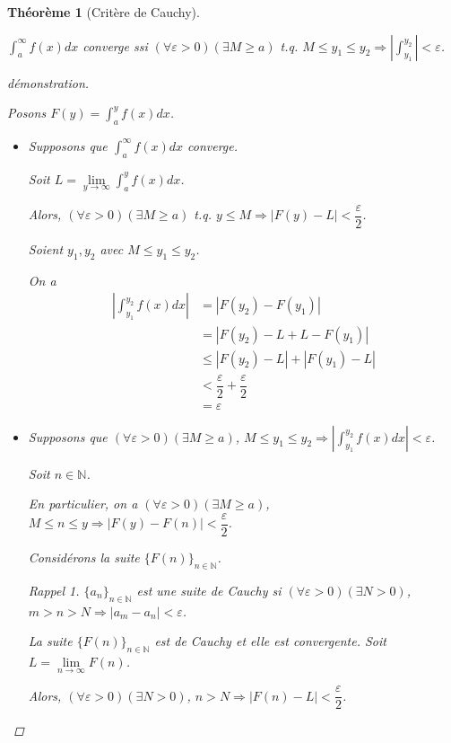 \documentclass{report}
\newcommand*{\abs}[1]{\left| #1 \right|}
\newcommand*{\eps}{\varepsilon}
\newcommand*{\naturels}{\mathbb{N}}
\newtheorem*{thm}{Th\'eor\`eme}
\theoremstyle{definition}
\theoremstyle{remark}
\newtheorem*{rapp}{Rappel}
\begin{document}
	\begin{thm}[Crit\`ere de Cauchy]~

		$\displaystyle\int_{a}^{\infty}f(x)dx$ converge ssi $(\forall\eps>0) (\exists M \geq a)$ t.q. $M \leq y_1 \leq y_2 \Rightarrow \abs{\displaystyle\int_{y_1}^{y_2}}<\eps$.
		\begin{proof}[d\'emonstration]~

			Posons $F(y) = \displaystyle\int_{a}^{y}f(x)dx$.
			\begin{itemize}
				\item[$(\Rightarrow)$] Supposons que $\displaystyle\int_{a}^{\infty}f(x)dx$ converge.

				Soit $L = \lim\limits_{y \to \infty}\displaystyle\int_{a}^{y}f(x)dx$.

				Alors, $(\forall\eps>0) (\exists M \geq a)$ t.q. $y \leq M \Rightarrow \abs{F(y)-L}<\dfrac{\eps}{2}$.

				Soient $y_1,y_2$ avec $M \leq y_1 \leq y_2$.

				On a
				\begin{align*}
					\abs{\int_{y_1}^{y_2}f(x)dx}&= \abs{F(y_2)-F(y_1)}\\
					&= \abs{F(y_2)-L+L-F(y_1)}\\
					&\leq \abs{F(y_2)-L} + \abs{F(y_1)-L}\\
					&< \dfrac{\eps}{2} + \dfrac{\eps}{2}\\
					&= \eps
				\end{align*}
				\item[$(\Leftarrow)$] Supposons que $(\forall\eps>0)(\exists M \geq a)$, $M \leq y_1 \leq y_2 \Rightarrow \abs{\int_{y_1}^{y_2}f(x)dx} < \eps$.

				Soit $n \in \naturels$.

				En particulier, on a $(\forall\eps>0) (\exists M \geq a)$, $M \leq n \leq y \Rightarrow \abs{F(y)-F(n)}<\dfrac{\eps}{2}$.

				Consid\'erons la suite $\{F(n)\}_{n \in \naturels}$.
				\begin{rapp}
					$\{a_n\}_{n \in \naturels}$ est une \emph{suite de Cauchy} si $(\forall\eps>0) (\exists N>0)$, $m>n>N \Rightarrow \abs{a_m-a_n}<\eps$.
				\end{rapp}

				La suite $\{F(n)\}_{n \in \naturels}$ est de Cauchy et elle est convergente. Soit $L = \lim\limits_{n \to \infty} F(n)$.

				Alors, $(\forall\eps>0) (\exists N>0)$, $n>N \Rightarrow \abs{F(n)-L}<\dfrac{\eps}{2}$.


\end{itemize}
\end{proof}
\end{thm}
\end{document}
